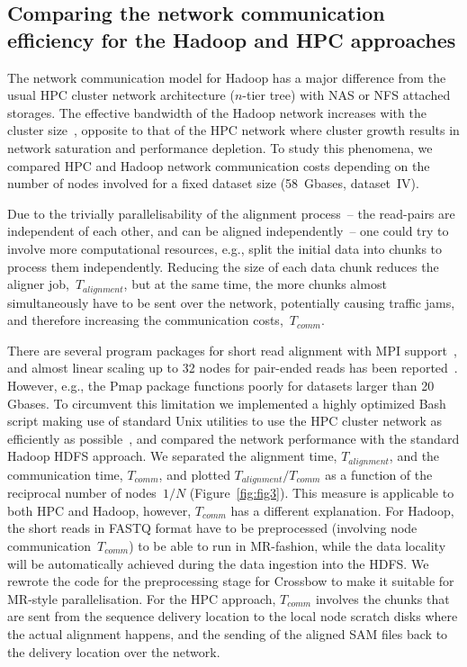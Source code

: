 \documentclass[10pt]{article}
\begin{document}
 \subsection*{Comparing the network communication efficiency for the Hadoop and HPC approaches }
The network communication model for Hadoop has a major difference from the usual HPC cluster network architecture ($n$-tier tree) with NAS or NFS attached storages. The effective bandwidth of the Hadoop network increases with the cluster size~\cite{Sammer:2012}, opposite to that of the HPC network where cluster growth results in network saturation and performance depletion.
To study this phenomena, we compared HPC and Hadoop network communication costs depending on the number of nodes involved for a fixed dataset size (58~Gbases, dataset~IV).
 
Due to the trivially parallelisability of the alignment process~-- the read-pairs are independent of each other, and can be aligned independently~-- one could try to involve more computational resources, e.g., split the initial data into chunks to process them independently.
Reducing the size of each data chunk reduces the aligner  job,~$T_{alignment}$, but at the same time, the more chunks almost simultaneously have to be sent over the network, potentially causing traffic jams, and therefore increasing the communication costs,~$T_{comm}$.

There are several program packages for short read alignment with MPI support~\cite{pmap, gnumap}, and almost linear scaling up to 32 nodes for pair-ended reads has been reported~\cite{Bozdag:2010cn}. However, e.g., the Pmap package functions poorly for datasets larger than 20 Gbases. To circumvent this limitation we implemented a highly optimized Bash script making use of standard Unix utilities to use the HPC cluster network as efficiently as possible~\cite{code_repo}, and compared the network performance with the standard Hadoop HDFS approach. We separated the alignment time, $T_{alignment}$, and the communication time, $T_{comm}$, and plotted $T_{alignment}/T_{comm}$ as a function of the reciprocal number of nodes~$1/N$ (Figure~\ref{fig:fig3}). 
This measure is applicable to both HPC and Hadoop, however, $T_{comm}$ has a different explanation. For Hadoop, the short reads in FASTQ format have to be preprocessed (involving node communication~$T_{comm}$) to be able to run in MR-fashion, while the data locality will be automatically achieved during the data ingestion into the HDFS. 
We rewrote the code for the preprocessing stage for Crossbow to make it suitable for MR-style parallelisation.
For the HPC approach, $T_{comm}$ involves the chunks that are sent from the sequence delivery location to the local node scratch disks where the actual alignment happens, and the sending of the aligned SAM files back to the delivery location over the network.
\end{document}
